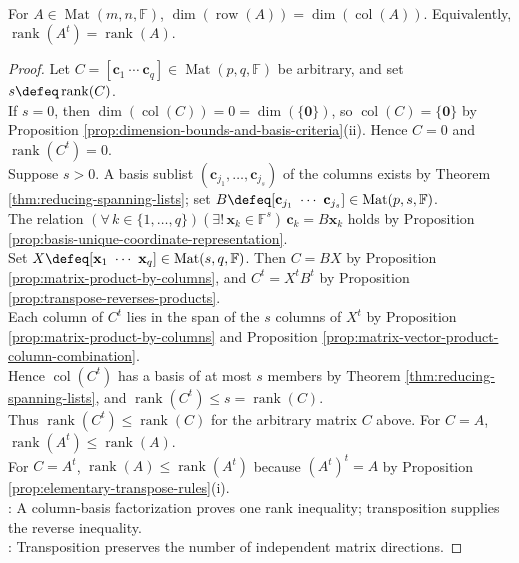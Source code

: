 \begin{theorem} \label{thm:row-rank-equals-column-rank} \\
For $A\in\operatorname{Mat}(m,n,\mathbb{F})$, $\dim(\operatorname{row}(A))=\dim(\operatorname{col}(A))$. Equivalently, $\operatorname{rank}(A^t)=\operatorname{rank}(A)$.
\begin{proof}
Let $C=[\mathbf{c}_1\ \cdots\ \mathbf{c}_q]\in\operatorname{Mat}(p,q,\mathbb{F})$ be arbitrary, and set $s\defeq\operatorname{rank}(C)$.\\
If $s=0$, then $\dim(\operatorname{col}(C))=0=\dim(\{\mathbf{0}\})$, so $\operatorname{col}(C)=\{\mathbf{0}\}$ by Proposition \ref{prop:dimension-bounds-and-basis-criteria}(ii). Hence $C=0$ and $\operatorname{rank}(C^t)=0$.\\
Suppose $s>0$. A basis sublist $(\mathbf{c}_{j_1},\ldots,\mathbf{c}_{j_s})$ of the columns exists by Theorem \ref{thm:reducing-spanning-lists}; set $B\defeq[\mathbf{c}_{j_1}\ \cdots\ \mathbf{c}_{j_s}]\in\operatorname{Mat}(p,s,\mathbb{F})$.\\
The relation $(\forall\,k\in\{1,\ldots,q\})(\exists!\,\mathbf{x}_k\in\mathbb{F}^s)\,\mathbf{c}_k=B\mathbf{x}_k$ holds by Proposition \ref{prop:basis-unique-coordinate-representation}.\\
Set $X\defeq[\mathbf{x}_1\ \cdots\ \mathbf{x}_q]\in\operatorname{Mat}(s,q,\mathbb{F})$. Then $C=BX$ by Proposition \ref{prop:matrix-product-by-columns}, and $C^t=X^tB^t$ by Proposition \ref{prop:transpose-reverses-products}.\\
Each column of $C^t$ lies in the span of the $s$ columns of $X^t$ by Proposition \ref{prop:matrix-product-by-columns} and Proposition \ref{prop:matrix-vector-product-column-combination}.\\
Hence $\operatorname{col}(C^t)$ has a basis of at most $s$ members by Theorem \ref{thm:reducing-spanning-lists}, and $\operatorname{rank}(C^t)\leq s=\operatorname{rank}(C)$.\\
Thus $\operatorname{rank}(C^t)\leq\operatorname{rank}(C)$ for the arbitrary matrix $C$ above. For $C=A$, $\operatorname{rank}(A^t)\leq\operatorname{rank}(A)$.\\
For $C=A^t$, $\operatorname{rank}(A)\leq\operatorname{rank}(A^t)$ because $(A^t)^t=A$ by Proposition \ref{prop:elementary-transpose-rules}(i).\\
: A column-basis factorization proves one rank inequality; transposition supplies the reverse inequality.\\
: Transposition preserves the number of independent matrix directions.
\end{proof}
\end{theorem}

